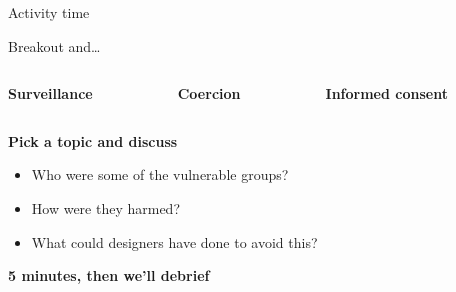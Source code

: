 \documentclass[main]{subfiles}
\begin{document}
\begin{frame}[standout]

Activity time
  
\end{frame}

\begin{frame}[t]{Breakout and\dots}
    

\centering

\vspace{2em}


\begin{columns}
\begin{column}{0.33\textwidth}
\centering \Large \bfseries
Surveillance
\end{column}
\begin{column}{0.33\textwidth}
\centering \Large \bfseries
Coercion
\end{column}
\begin{column}{0.33\textwidth}
\centering \Large \bfseries
Informed consent
\end{column}
\end{columns}


\vfill
{\large \bfseries Pick a topic and discuss}

\begin{itemize}
  \item Who were some of the vulnerable groups?
  \item How were they harmed?
  \item What could designers have done to avoid this?
\end{itemize}

\Large \bfseries 5 minutes, then we'll debrief


\end{frame}
\end{document}
